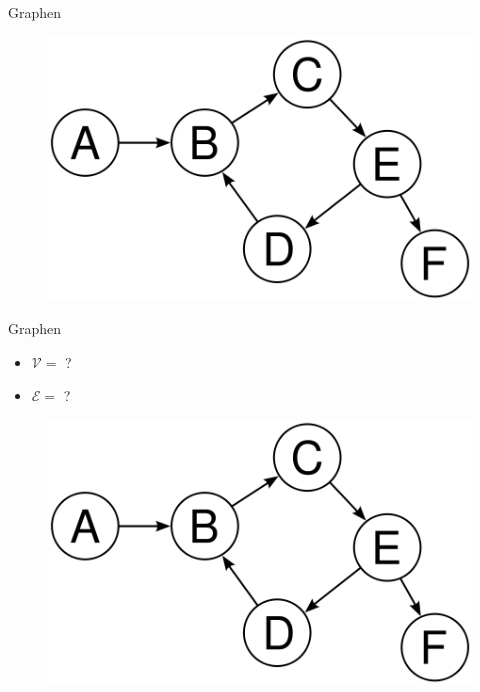 \documentclass[18pt]{beamer}
\begin{document}
\begin{frame}{Graphen}
        \begin{figure}
            \includegraphics[scale=.5]{img/graph.png}
        \end{figure}

\end{frame}


\begin{frame}{Graphen}

        \begin{exampleblock}{}
            \begin{itemize}
                \item $\mathcal{V} = $ ?
                \item $\mathcal{E} = $ ?
            \end{itemize}
        \end{exampleblock}


        \begin{figure}
            \includegraphics[scale=.3]{img/graph.png}
        \end{figure}

\end{frame}
\end{document}
